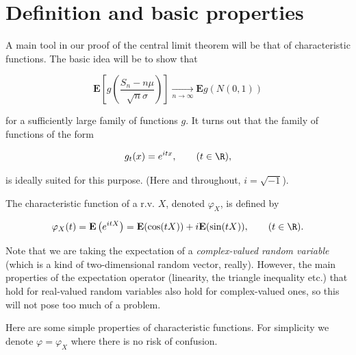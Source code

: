 \section{Definition and basic properties}

A main tool in our proof of the central limit theorem
will be that of characteristic functions. The basic
idea will be to show that

\[
\mathbf{E}\left[ g\left( \frac{S_n-n\mu}{\sqrt{n}\sigma}\right)\right] \xrightarrow[n\to\infty]{} \mathbf{E} g(N(0,1))
\]

\noindent for a sufficiently large family of functions $g$. It
turns out that the family of functions of the form

\[
g_t(x) = e^{itx}, \qquad (t\in\R),
\]

\noindent is ideally suited for this purpose. (Here and
throughout, $i=\sqrt{-1}$).

\begin{defn}
The characteristic function of a r.v. $X$, denoted
$\varphi_X$, is defined by

\[
\varphi_X(t) = \mathbf{E}\left(e^{i t X}\right) = \mathbf{E}(\cos(t X)) + i \mathbf{E}(\sin(t X)), \qquad (t\in\R).
\]

\end{defn}

\noindent Note that we are taking the expectation of a
\emph{complex-valued random variable} (which is a kind of
two-dimensional random vector, really). However, the
main properties of the expectation operator
(linearity, the triangle inequality etc.) that hold
for real-valued random variables also hold for
complex-valued ones, so this will not pose too much of
a problem.

Here are some simple properties of characteristic
functions. For simplicity we denote
$\varphi = \varphi_X$ where there is no risk of
confusion.

